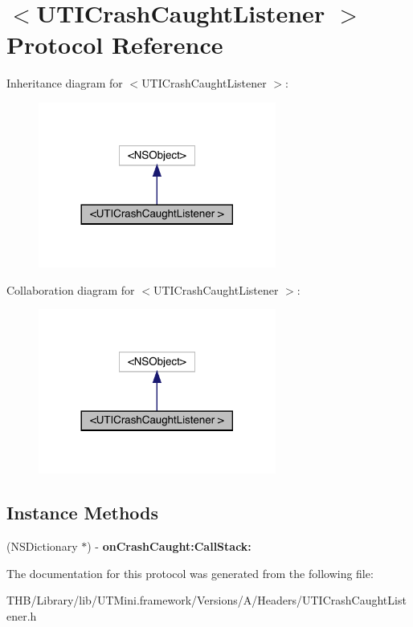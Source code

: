 \hypertarget{protocol_u_t_i_crash_caught_listener_01-p}{}\section{$<$U\+T\+I\+Crash\+Caught\+Listener $>$ Protocol Reference}
\label{protocol_u_t_i_crash_caught_listener_01-p}


Inheritance diagram for $<$U\+T\+I\+Crash\+Caught\+Listener $>$\+:\nopagebreak
\begin{figure}[H]
\begin{center}
\leavevmode
\includegraphics[width=221pt]{protocol_u_t_i_crash_caught_listener_01-p__inherit__graph}
\end{center}
\end{figure}


Collaboration diagram for $<$U\+T\+I\+Crash\+Caught\+Listener $>$\+:\nopagebreak
\begin{figure}[H]
\begin{center}
\leavevmode
\includegraphics[width=221pt]{protocol_u_t_i_crash_caught_listener_01-p__coll__graph}
\end{center}
\end{figure}
\subsection*{Instance Methods}
\begin{DoxyCompactItemize}
\item 
\mbox{\label{protocol_u_t_i_crash_caught_listener_01-p_a2584cb71f6651b835d9239290925af4e}} 
(N\+S\+Dictionary $\ast$) -\/ {\bfseries on\+Crash\+Caught\+:\+Call\+Stack\+:}
\end{DoxyCompactItemize}


The documentation for this protocol was generated from the following file\+:\begin{DoxyCompactItemize}
\item 
T\+H\+B/\+Library/lib/\+U\+T\+Mini.\+framework/\+Versions/\+A/\+Headers/U\+T\+I\+Crash\+Caught\+Listener.\+h\end{DoxyCompactItemize}
